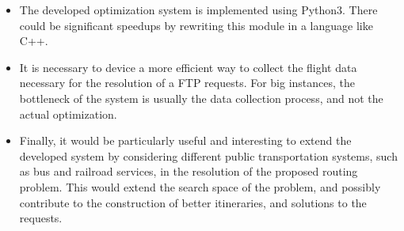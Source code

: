 \begin{itemize}
    
    \item The developed optimization system is implemented using Python3. There could be significant speedups by rewriting this module in a language like C++.
    
    \item 
    It is necessary to device a more efficient way to collect the flight data necessary for the resolution of a FTP requests. For big instances, the bottleneck of the system is usually the data collection process, and not the actual optimization.
    
    \item Finally, it would be particularly useful and interesting to extend the developed system by considering different public  transportation systems, such as bus and railroad services, in the resolution of the proposed routing problem. This would extend the search space of the problem, and possibly contribute to the construction of better itineraries, and solutions to the requests.
    
    
\end{itemize}


































